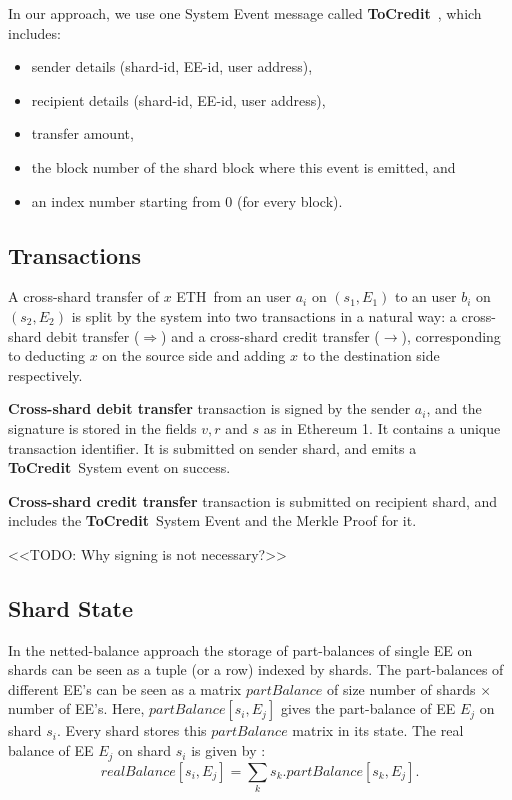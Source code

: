\documentclass{article}
\newcommand{\eth}[0]{ETH~}
\newcommand{\tocredit}[0]{{\bf ToCredit}~}
\begin{document}
In our approach, we use one System Event message called \tocredit, which includes:
\begin{itemize}
\item sender details (shard-id, EE-id, user address), 
\item recipient details (shard-id, EE-id, user address), 
\item transfer amount, 
\item the block number of the shard block where this event is emitted, and 
\item an index number starting from 0 (for every block).
\end{itemize}

\subsection{Transactions}

A cross-shard transfer of $x$ \eth from an user $a_i$ on $(s_1,E_1)$ to an user $b_i$ on $(s_2,E_2)$ is split by the system into two transactions in a natural way: a cross-shard debit transfer ($\Longrightarrow$) and a cross-shard credit transfer ($\longrightarrow$), corresponding to deducting $x$ on the source side and adding $x$ to the destination side respectively. 

{\bf Cross-shard debit transfer} transaction is signed by the sender $a_i$, and the signature is stored in the fields $v, r$ and $s$ as in Ethereum 1. It contains a unique transaction identifier. It is submitted on sender shard, and emits a \tocredit System event on success.

{\bf Cross-shard credit transfer} transaction is submitted on recipient shard, and includes the \tocredit System Event and the Merkle Proof for it.

<<TODO: Why signing is not necessary?>>

\subsection{Shard State}
In the netted-balance approach the storage of part-balances of single EE on shards can be seen as a tuple (or a row) indexed by shards. The part-balances of different EE's can be seen as a matrix $partBalance$ of size number of shards $\times$ number of EE's. Here, $partBalance[s_i,E_j]$ gives the part-balance of EE $E_j$ on shard $s_i$. Every shard stores this  $partBalance$ matrix in its state. The real balance of EE $E_j$ on shard $s_i$ is given by : 
\[
	realBalance[s_i,E_j] = \sum_k s_k.partBalance[s_k,E_j].
\]
\end{document}
